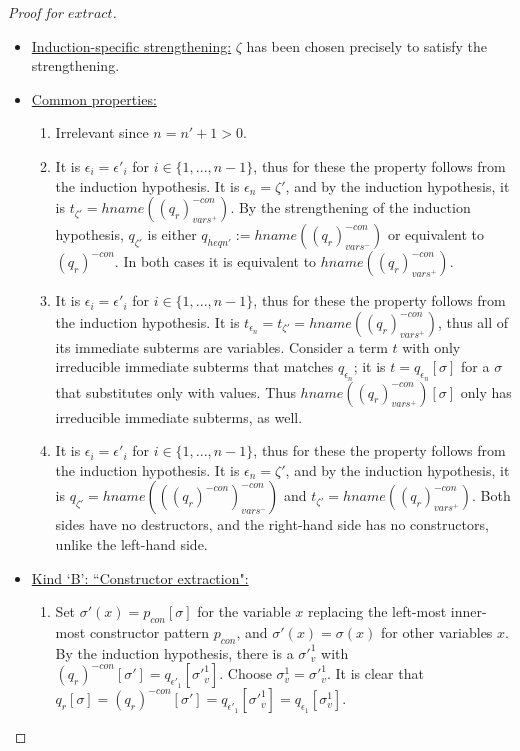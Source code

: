 \documentclass[11pt]{article} %
\begin{document}
\begin{proof}[Proof for $extract$]
\begin{itemize}
\begin{itemize}
\item \underline{Induction-specific strengthening:} $\zeta$ has been chosen precisely to satisfy the strengthening.

\item \underline{Common properties:}
\begin{enumerate}
\item Irrelevant since $n = n'+1 > 0$.
\item It is $\epsilon_i = \epsilon'_i$ for $i \in \{1, ..., n-1\}$, thus for these the property follows from the induction hypothesis. It is $\epsilon_n = \zeta'$, and by the induction hypothesis, it is $t_{\zeta'} = hname((q_r)^{-con}_{vars^+})$. By the strengthening of the induction hypothesis, $q_{\zeta'}$ is either $q_{heqn'} := hname((q_r)^{-con}_{vars^-})$ or equivalent to $(q_r)^{-con}$. In both cases it is equivalent to $hname((q_r)^{-con}_{vars^+})$.
\item It is $\epsilon_i = \epsilon'_i$ for $i \in \{1, ..., n-1\}$, thus for these the property follows from the induction hypothesis. It is $t_{\epsilon_n} = t_{\zeta'} = hname((q_r)^{-con}_{vars^+})$, thus all of its immediate subterms are variables. Consider a term $t$ with only irreducible immediate subterms that matches $q_{\epsilon_n}$; it is $t = q_{\epsilon_n}[\sigma]$ for a $\sigma$ that substitutes only with values. Thus $hname((q_r)^{-con}_{vars^+})[\sigma]$ only has irreducible immediate subterms, as well.
\item It is $\epsilon_i = \epsilon'_i$ for $i \in \{1, ..., n-1\}$, thus for these the property follows from the induction hypothesis. It is $\epsilon_n = \zeta'$, and by the induction hypothesis, it is $q_{\zeta'} = hname(((q_r)^{-con})^{-con}_{vars^-})$ and $t_{\zeta'} = hname((q_r)^{-con}_{vars^+})$. Both sides have no destructors, and the right-hand side has no constructors, unlike the left-hand side.
\end{enumerate}

\item \underline{Kind `B': ``Constructor extraction":}
\begin{enumerate}
\item Set $\sigma'(x) = p_{con}[\sigma]$ for the variable $x$ replacing the left-most inner- most constructor pattern $p_{con}$, and $\sigma'(x) = \sigma(x)$ for other variables $x$. By the induction hypothesis, there is a $\sigma'^1_v$ with $(q_r)^{-con}[\sigma'] = q_{\epsilon'_1}[\sigma'^1_v]$. Choose $\sigma^1_v = \sigma'^1_v$. It is clear that $q_r[\sigma] = (q_r)^{-con}[\sigma'] = q_{\epsilon'_1}[\sigma'^1_v] = q_{\epsilon_1}[\sigma^1_v]$.


\end{enumerate}
\end{itemize}
\end{itemize}
\end{proof}
\end{document}
